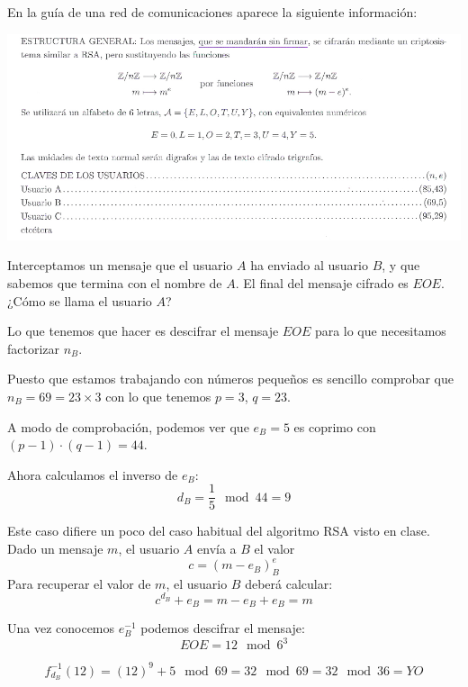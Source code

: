\begin{problem}[3]
En la guía de una red de comunicaciones aparece la siguiente información:

\begin{center}
\includegraphics[width=\textwidth]{img/info_estructura_red_parcial.png}
\end{center}

Interceptamos un mensaje que el usuario $A$ ha enviado al usuario $B$, y que sabemos que termina con el nombre de $A$. El final del mensaje cifrado es $EOE$. ¿Cómo se llama el usuario $A$?
\solution


Lo que tenemos que hacer es descifrar el mensaje $EOE$ para lo que necesitamos factorizar $n_B$.

Puesto que estamos trabajando con números pequeños es sencillo comprobar que $n_B=69 = 23\times 3$ con lo que tenemos $p=3$, $q = 23$.

A modo de comprobación, podemos ver que $e_B=5$ es coprimo con $(p-1)\cdot (q-1) = 44$.

Ahora calculamos el inverso de $e_B$:
\[d_B= \frac{1}{5} \mod 44 = 9\]

Este caso difiere un poco del caso habitual del algoritmo RSA visto en clase. Dado un mensaje $m$, el usuario $A$ envía a $B$ el valor
\[c = (m-e_B)^e_B\]
Para recuperar el valor de $m$, el usuario $B$ deberá calcular:
\[c^{d_B}+e_B = m-e_B+e_B = m\]

Una vez conocemos $e_B^{-1}$ podemos descifrar el mensaje:
\[EOE = 12 \mod 6^3 \]

\[f_{d_B}^{-1}(12) = (12)^9 + 5\mod 69 = 32 \mod 69 = 32 \mod 36 = YO\]

\end{problem}

